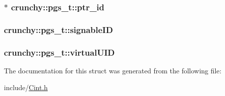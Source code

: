 \subsubsection[{ptr\+\_\+id}]{$\ast$ crunchy\+::pgs\+\_\+t\+::ptr\+\_\+id}\label{structcrunchy_1_1pgs__t_ae7503cb4a27d99838883861d63750817}
\hypertarget{structcrunchy_1_1pgs__t_a9a56b73215866d5bde8455f7752e9572}{}
\subsubsection[{signable\+I\+D}]{ crunchy\+::pgs\+\_\+t\+::signable\+I\+D}\label{structcrunchy_1_1pgs__t_a9a56b73215866d5bde8455f7752e9572}
\hypertarget{structcrunchy_1_1pgs__t_a826bb981b0483387e8c5ae31c0ed106f}{}
\subsubsection[{virtual\+U\+I\+D}]{ crunchy\+::pgs\+\_\+t\+::virtual\+U\+I\+D}\label{structcrunchy_1_1pgs__t_a826bb981b0483387e8c5ae31c0ed106f}


The documentation for this struct was generated from the following file\+:\begin{DoxyCompactItemize}
\item 
include/\hyperlink{_cint_8h}{Cint.\+h}\end{DoxyCompactItemize}
